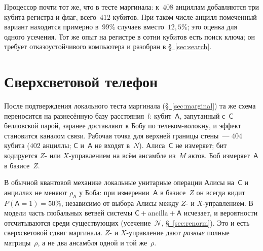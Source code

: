 \documentclass[11pt,a4paper]{article}
\newcommand{\qC}{\mathsf{C}}
\newcommand{\qA}{\mathsf{A}}
\begin{document}
Процессор почти тот же, что в тесте маргинала: к~$408$ анциллам добавляются три кубита регистра и флаг, всего~$412$ кубитов. При таком числе анцилл помеченный вариант находится примерно в~$99\%$ случаев вместо~$12{,}5\%$; это оценка для одного усечения. Тот же опыт на регистре в сотни кубитов есть поиск ключа; он требует отказоустойчивого компьютера и разобран в \hyperref[sec:search]{\S~\ref*{sec:search}}.

\begin{center}
\begin{minipage}{\linewidth}\centering

\label{fig:search}
\end{minipage}
\end{center}

\section{Сверхсветовой телефон}
\label{sec:signaling}

После подтверждения локального теста маргинала (\hyperref[sec:marginal]{\S~\ref*{sec:marginal}}) та же схема переносится на разнесённую базу расстояния~$l$: кубит~$\qA$, запутанный с~$\qC$ белловской парой, заранее доставляют к Бобу по телеком-волокну, и эффект становится каналом связи. Рабочая точка для верхней границы стены~--- $404$ кубита ($402$ анциллы; $\qC$ и~$\qA$ не входят в~$N$). Алиса~$\qC$ не измеряет; бит кодируется $Z$- или $X$-управлением на всём ансамбле из~$M$ актов. Боб измеряет~$\qA$ в базисе~$Z$.

В обычной квантовой механике локальные унитарные операции Алисы на~$\qC$ и анциллах не меняют $\rho_{\qA}$ у Боба: при измерении~$\qA$ в базисе~$Z$ он всегда видит $P(\qA{=}1)=50\%$, независимо от выбора Алисы между $Z$- и $X$-управлением. В модели часть глобальных ветвей системы $\qC+\text{ancilla}+\qA$ исчезает, и вероятности отсчитываются среди существующих (усечение~$\mathcal N$, \hyperref[sec:renorm]{\S~\ref*{sec:renorm}}). Это и есть сверхсветовой сдвиг маргинала. $Z$- и $X$-управление дают \emph{разные} полные матрицы~$\rho$, а не два ансамбля одной и той же~$\rho$.
\end{document}
